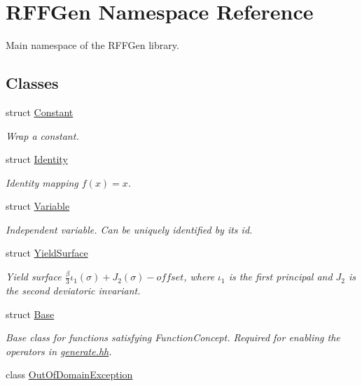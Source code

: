 \hypertarget{namespaceRFFGen}{\section{R\-F\-F\-Gen Namespace Reference}
\label{namespaceRFFGen}
}


Main namespace of the R\-F\-F\-Gen library.  


\subsection*{Classes}
\begin{DoxyCompactItemize}
\item 
struct \hyperlink{structRFFGen_1_1Constant}{Constant}
\begin{DoxyCompactList}\small\item\em Wrap a constant. \end{DoxyCompactList}\item 
struct \hyperlink{structRFFGen_1_1Identity}{Identity}
\begin{DoxyCompactList}\small\item\em Identity mapping $ f(x)=x $. \end{DoxyCompactList}\item 
struct \hyperlink{structRFFGen_1_1Variable}{Variable}
\begin{DoxyCompactList}\small\item\em Independent variable. Can be uniquely identified by its id. \end{DoxyCompactList}\item 
struct \hyperlink{structRFFGen_1_1YieldSurface}{Yield\-Surface}
\begin{DoxyCompactList}\small\item\em Yield surface $ \frac{\beta}{3}\iota_1(\sigma) + J_2(\sigma)-offset $, where $\iota_1$ is the first principal and $J_2$ is the second deviatoric invariant. \end{DoxyCompactList}\item 
struct \hyperlink{structRFFGen_1_1Base}{Base}
\begin{DoxyCompactList}\small\item\em Base class for functions satisfying Function\-Concept. Required for enabling the operators in \hyperlink{generate_8hh_source}{generate.\-hh}. \end{DoxyCompactList}\item 
class \hyperlink{classRFFGen_1_1OutOfDomainException}{Out\-Of\-Domain\-Exception}

\end{DoxyCompactItemize}
